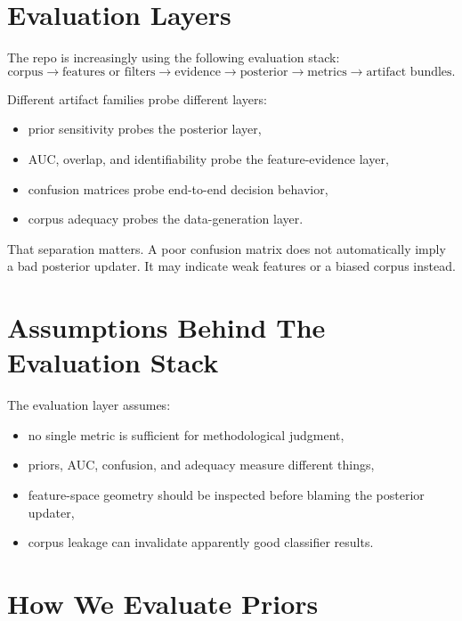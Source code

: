 \documentclass[11pt]{article}
\begin{document}
\section{Evaluation Layers}

The repo is increasingly using the following evaluation stack:
\begin{equation}
    \text{corpus}
    \rightarrow
    \text{features or filters}
    \rightarrow
    \text{evidence}
    \rightarrow
    \text{posterior}
    \rightarrow
    \text{metrics}
    \rightarrow
    \text{artifact bundles}.
\end{equation}

Different artifact families probe different layers:
\begin{itemize}[leftmargin=1.5em]
    \item prior sensitivity probes the posterior layer,
    \item AUC, overlap, and identifiability probe the feature-evidence layer,
    \item confusion matrices probe end-to-end decision behavior,
    \item corpus adequacy probes the data-generation layer.
\end{itemize}

That separation matters. A poor confusion matrix does not automatically imply a
bad posterior updater. It may indicate weak features or a biased corpus instead.

\section{Assumptions Behind The Evaluation Stack}

The evaluation layer assumes:
\begin{itemize}[leftmargin=1.5em]
    \item no single metric is sufficient for methodological judgment,
    \item priors, AUC, confusion, and adequacy measure different things,
    \item feature-space geometry should be inspected before blaming the posterior updater,
    \item corpus leakage can invalidate apparently good classifier results.
\end{itemize}

\section{How We Evaluate Priors}
\end{document}
